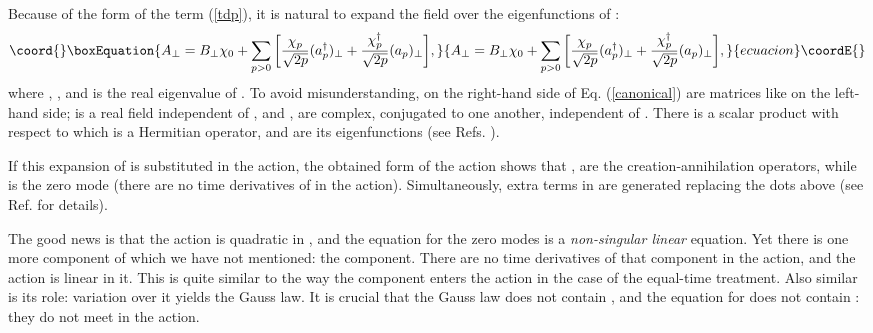 \documentclass[a4paper,12pt]{article}
\begin{document}
Because of the form of the term (\ref{tdp}), 
it is natural to expand the field 
\coordHE{} over the eigenfunctions of \coordHE{}:
\begin{equation}\coord{}\boxEquation{
\label{canonical}
A_\perp = B_\perp\chi_0 + 
\sum_{p>0}\bigg[\frac{\chi_p}{\sqrt{2p}}(a_p^\dagger)_\perp 
+\frac{\chi_p^\dagger}{\sqrt{2p}}(a_p)_\perp\bigg],
}{
A_\perp = B_\perp\chi_0 + 
\sum_{p>0}\bigg[\frac{\chi_p}{\sqrt{2p}}(a_p^\dagger)_\perp 
+\frac{\chi_p^\dagger}{\sqrt{2p}}(a_p)_\perp\bigg],
}{ecuacion}\coordE{}\end{equation}
where \coordHE{}, \coordHE{}, 
and \coordHE{} is the real eigenvalue of \coordHE{}. 
To avoid misunderstanding, \coordHE{} 
on the right-hand side
of Eq. (\ref{canonical}) are matrices like \coordHE{} on the 
left-hand side; \coordHE{} 
is a real field independent of \coordHE{}, and 
\coordHE{}, \coordHE{} are complex, 
conjugated to one another, independent of \coordHE{}. 
There is a scalar product with 
respect to which \coordHE{} is a Hermitian operator, 
and \coordHE{} are its 
eigenfunctions (see Refs. \cite{KMPV,Naus}).

If this expansion of \coordHE{} is substituted in the action, 
the obtained form of the 
action shows that \coordHE{}, \coordHE{} 
are the creation-annihilation 
operators, while \coordHE{} is the zero mode (there 
are no time derivatives of 
\coordHE{} in the action). Simultaneously, extra terms 
in \coordHE{} are generated replacing 
the dots above (see Ref. \cite{KMPV} for details).

The good news is that the action is quadratic in \coordHE{}, 
and the equation for the zero modes is a 
{\it non-singular linear} equation. 
Yet there is one more component of \coordHE{} which we have not 
mentioned: the \coordHE{} component. There are no time derivatives 
of that component in the action, 
and the action is linear in it. This is quite similar 
to the way the \coordHE{} component 
enters the action in the case of the equal-time treatment. 
Also similar is its role: 
variation over it yields the Gauss law. 
It is crucial that the Gauss law does not 
contain \coordHE{}, and the equation for \coordHE{} 
does not contain \coordHE{}: they 
do not meet in the action. 
\end{document}
